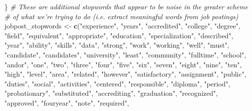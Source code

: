 \documentclass[]{article}
\newenvironment{Shaded}{\begin{snugshade}}{\end{snugshade}}
\newcommand{\CommentTok}[1]{\textcolor[rgb]{0.56,0.35,0.01}{\textit{#1}}}
\newcommand{\KeywordTok}[1]{\textcolor[rgb]{0.13,0.29,0.53}{\textbf{#1}}}
\newcommand{\NormalTok}[1]{#1}
\newcommand{\StringTok}[1]{\textcolor[rgb]{0.31,0.60,0.02}{#1}}
\begin{document}
\begin{Shaded}
\begin{Highlighting}[]
{{{{{{{{{{\NormalTok{\}}
\CommentTok{# These are additional stopwords that appear to be noise in the greater scheme}
\CommentTok{# of what we're trying to do (i.e. extract meaningful words from job postings)}
\NormalTok{jobpost_stopwords <-}\StringTok{ }\KeywordTok{c}\NormalTok{(}\StringTok{"experience"}\NormalTok{, }\StringTok{"years"}\NormalTok{, }\StringTok{"accredited"}\NormalTok{, }\StringTok{"college"}\NormalTok{, }\StringTok{"degree"}\NormalTok{,}
                       \StringTok{"field"}\NormalTok{, }\StringTok{"equivalent"}\NormalTok{, }\StringTok{"appropriate"}\NormalTok{, }\StringTok{"education"}\NormalTok{,}
                       \StringTok{"specialization"}\NormalTok{, }\StringTok{"described"}\NormalTok{, }\StringTok{"year"}\NormalTok{, }\StringTok{"ability"}\NormalTok{,}
                       \StringTok{"skills"}\NormalTok{, }\StringTok{"data"}\NormalTok{, }\StringTok{"strong"}\NormalTok{, }\StringTok{"work"}\NormalTok{, }\StringTok{"working"}\NormalTok{, }\StringTok{"well"}\NormalTok{,}
                       \StringTok{"must"}\NormalTok{, }\StringTok{"candidate"}\NormalTok{, }\StringTok{"candidates"}\NormalTok{, }\StringTok{"university"}\NormalTok{, }\StringTok{"least"}\NormalTok{,}
                       \StringTok{"community"}\NormalTok{, }\StringTok{"fulltime"}\NormalTok{, }\StringTok{"school"}\NormalTok{, }\StringTok{"andor"}\NormalTok{, }\StringTok{"one"}\NormalTok{, }\StringTok{"two"}\NormalTok{,}
                       \StringTok{"three"}\NormalTok{, }\StringTok{"four"}\NormalTok{, }\StringTok{"five"}\NormalTok{, }\StringTok{"six"}\NormalTok{, }\StringTok{"seven"}\NormalTok{, }\StringTok{"eight"}\NormalTok{, }\StringTok{"nine"}\NormalTok{,}
                       \StringTok{"ten"}\NormalTok{, }\StringTok{"high"}\NormalTok{, }\StringTok{"level"}\NormalTok{, }\StringTok{"area"}\NormalTok{, }\StringTok{"related"}\NormalTok{, }\StringTok{"however"}\NormalTok{,}
                       \StringTok{"satisfactory"}\NormalTok{, }\StringTok{"assignment"}\NormalTok{, }\StringTok{"public"}\NormalTok{, }\StringTok{"duties"}\NormalTok{, }\StringTok{"social"}\NormalTok{,}
                       \StringTok{"activities"}\NormalTok{, }\StringTok{"centered"}\NormalTok{, }\StringTok{"responsible"}\NormalTok{, }\StringTok{"diploma"}\NormalTok{, }\StringTok{"period"}\NormalTok{,}
                       \StringTok{"probationary"}\NormalTok{, }\StringTok{"substituted"}\NormalTok{, }\StringTok{"accrediting"}\NormalTok{, }\StringTok{"graduation"}\NormalTok{,}
                       \StringTok{"recognized"}\NormalTok{, }\StringTok{"approved"}\NormalTok{, }\StringTok{"fouryear"}\NormalTok{, }\StringTok{"note"}\NormalTok{, }\StringTok{"required"}\NormalTok{,}
}}}}}}}}}}
\end{Highlighting}
\end{Shaded}
\end{document}
